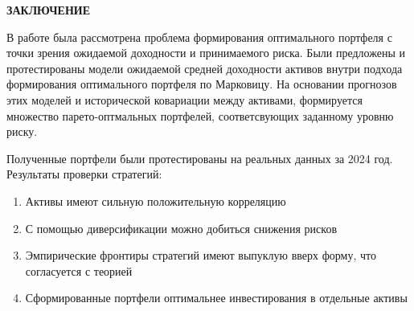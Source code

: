 \newpage
\begin{center}
	\textbf{\large ЗАКЛЮЧЕНИЕ}
\end{center}

В работе была рассмотрена проблема формирования оптимального портфеля с точки зрения ожидаемой доходности и принимаемого риска.
Были предложены и протестированы модели ожидаемой средней доходности активов внутри подхода формирования оптимального портфеля по Марковицу.
На основании прогнозов этих моделей и исторической ковариации
между активами, формируется множество парето-оптмальных портфелей, соответсвующих заданному уровню риску.

Полученные портфели были протестированы на реальных данных за 2024 год. Результаты проверки стратегий:
\begin{enumerate}
	\item Активы имеют сильную положительную корреляцию
	\item С помощью диверсификации можно добиться снижения рисков
	\item Эмпирические фронтиры стратегий имеют выпуклую вверх форму, что согласуется с теорией
	\item Сформированные портфели оптимальнее инвестирования в отдельные активы
\end{enumerate}